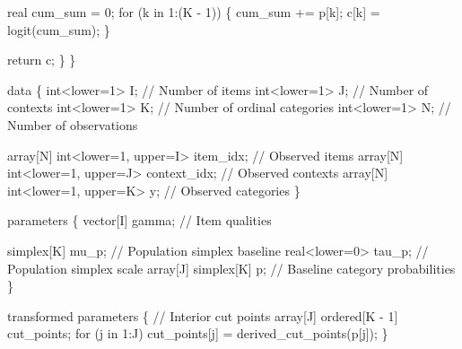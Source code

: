 \documentclass[
  letterpaper,
  DIV=11,
  numbers=noendperiod]{scrartcl}
\newenvironment{Shaded}{\begin{snugshade}}{\end{snugshade}}
\newcommand{\CommentTok}[1]{\textcolor[rgb]{0.37,0.37,0.37}{#1}}
\newcommand{\ControlFlowTok}[1]{\textcolor[rgb]{0.00,0.23,0.31}{#1}}
\newcommand{\DataTypeTok}[1]{\textcolor[rgb]{0.68,0.00,0.00}{#1}}
\newcommand{\DecValTok}[1]{\textcolor[rgb]{0.68,0.00,0.00}{#1}}
\newcommand{\KeywordTok}[1]{\textcolor[rgb]{0.00,0.23,0.31}{#1}}
\newcommand{\NormalTok}[1]{\textcolor[rgb]{0.00,0.23,0.31}{#1}}
\begin{document}
\begin{codelisting}
\begin{Shaded}
\begin{Highlighting}[]
    \DataTypeTok{real}\NormalTok{ cum\_sum = }\DecValTok{0}\NormalTok{;}
    \ControlFlowTok{for}\NormalTok{ (k }\ControlFlowTok{in} \DecValTok{1}\NormalTok{:(K {-} }\DecValTok{1}\NormalTok{)) \{}
\NormalTok{      cum\_sum += p[k];}
\NormalTok{      c[k] = logit(cum\_sum);}
\NormalTok{    \}}

    \ControlFlowTok{return}\NormalTok{ c;}
\NormalTok{  \}}
\NormalTok{\}}

\KeywordTok{data}\NormalTok{ \{}
  \DataTypeTok{int}\NormalTok{\textless{}}\KeywordTok{lower}\NormalTok{=}\DecValTok{1}\NormalTok{\textgreater{} I; }\CommentTok{// Number of items}
  \DataTypeTok{int}\NormalTok{\textless{}}\KeywordTok{lower}\NormalTok{=}\DecValTok{1}\NormalTok{\textgreater{} J; }\CommentTok{// Number of contexts}
  \DataTypeTok{int}\NormalTok{\textless{}}\KeywordTok{lower}\NormalTok{=}\DecValTok{1}\NormalTok{\textgreater{} K; }\CommentTok{// Number of ordinal categories}
  \DataTypeTok{int}\NormalTok{\textless{}}\KeywordTok{lower}\NormalTok{=}\DecValTok{1}\NormalTok{\textgreater{} N; }\CommentTok{// Number of observations}

  \DataTypeTok{array}\NormalTok{[N] }\DataTypeTok{int}\NormalTok{\textless{}}\KeywordTok{lower}\NormalTok{=}\DecValTok{1}\NormalTok{, }\KeywordTok{upper}\NormalTok{=I\textgreater{} item\_idx;    }\CommentTok{// Observed items}
  \DataTypeTok{array}\NormalTok{[N] }\DataTypeTok{int}\NormalTok{\textless{}}\KeywordTok{lower}\NormalTok{=}\DecValTok{1}\NormalTok{, }\KeywordTok{upper}\NormalTok{=J\textgreater{} context\_idx; }\CommentTok{// Observed contexts}
  \DataTypeTok{array}\NormalTok{[N] }\DataTypeTok{int}\NormalTok{\textless{}}\KeywordTok{lower}\NormalTok{=}\DecValTok{1}\NormalTok{, }\KeywordTok{upper}\NormalTok{=K\textgreater{} y;           }\CommentTok{// Observed categories}
\NormalTok{\}}

\KeywordTok{parameters}\NormalTok{ \{}
  \DataTypeTok{vector}\NormalTok{[I] gamma; }\CommentTok{// Item qualities}

  \DataTypeTok{simplex}\NormalTok{[K] mu\_p;       }\CommentTok{// Population simplex baseline}
  \DataTypeTok{real}\NormalTok{\textless{}}\KeywordTok{lower}\NormalTok{=}\DecValTok{0}\NormalTok{\textgreater{} tau\_p;   }\CommentTok{// Population simplex scale}
  \DataTypeTok{array}\NormalTok{[J] }\DataTypeTok{simplex}\NormalTok{[K] p; }\CommentTok{// Baseline category probabilities}
\NormalTok{\}}

\KeywordTok{transformed parameters}\NormalTok{ \{}
  \CommentTok{// Interior cut points}
  \DataTypeTok{array}\NormalTok{[J] }\DataTypeTok{ordered}\NormalTok{[K {-} }\DecValTok{1}\NormalTok{] cut\_points;}
  \ControlFlowTok{for}\NormalTok{ (j }\ControlFlowTok{in} \DecValTok{1}\NormalTok{:J)}
\NormalTok{    cut\_points[j] = derived\_cut\_points(p[j]);}
\NormalTok{\}}


\end{Highlighting}
\end{Shaded}
\end{codelisting}
\end{document}
